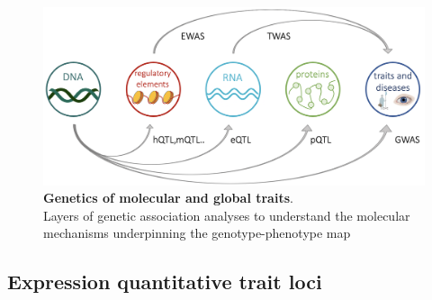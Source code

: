 




\begin{figure}[h]
\centering
\includegraphics[width=15cm]{Chapter1/Fig/layers_of_genetic_associations_draft.png}
\caption[Genetics of molecular and global traits]{\textbf{Genetics of molecular and global traits}.\\
Layers of genetic association analyses to understand the molecular mechanisms underpinning the genotype-phenotype map}
\label{fig:molecular_genetic_associations}
\end{figure}

\newpage

\subsection{Expression quantitative trait loci}\label{sec:eqtl}

